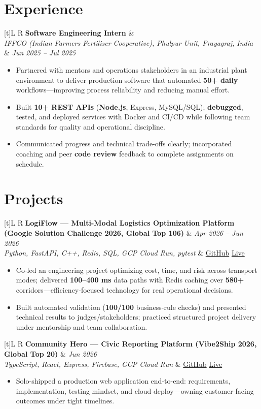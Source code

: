 \documentclass[a4paper,10pt]{article}
\newcommand{\resumeSubheading}[4]{%
  \vspace{0.4mm}
  \noindent
  \begin{tabularx}{\textwidth}[t]{L R}
    \textbf{#1} & #4 \\
    \textit{#3} & \textit{#2} \\
  \end{tabularx}
  \vspace{-0.4mm}%
}
\newcommand{\resumeProject}[4]{%
  \vspace{0.4mm}
  \noindent
  \begin{tabularx}{\textwidth}[t]{L R}
    \textbf{#1} & \textit{#3} \\
    \textit{#2} & #4 \\
  \end{tabularx}
  \vspace{-0.4mm}%
}
\begin{document}
\section{Experience}
\small
\resumeSubheading
  {Software Engineering Intern}{Jun 2025 -- Jul 2025}
  {IFFCO (Indian Farmers Fertiliser Cooperative), Phulpur Unit, Prayagraj, India}{}
\begin{itemize}
  \item Partnered with mentors and operations stakeholders in an industrial plant environment to deliver production software that automated \textbf{50+ daily} workflows---improving process reliability and reducing manual effort.
  \item Built \textbf{10+ REST APIs} (\textbf{Node.js}, Express, MySQL/SQL); \textbf{debugged}, tested, and deployed services with Docker and CI/CD while following team standards for quality and operational discipline.
  \item Communicated progress and technical trade-offs clearly; incorporated coaching and peer \textbf{code review} feedback to complete assignments on schedule.
\end{itemize}

\section{Projects}
\small

\resumeProject
  {LogiFlow --- Multi-Modal Logistics Optimization Platform (Google Solution Challenge 2026, Global Top 106)}
  {Python, FastAPI, C++, Redis, SQL, GCP Cloud Run, pytest}
  {Apr 2026 -- Jun 2026}
  {\href{https://github.com/Ojas-Srivastava05/LogiFlow-Solution-Challenge-2026}{GitHub} \textbar{} \href{https://logi-flow-solution-challenge-2026.vercel.app/}{Live}}
\begin{itemize}
  \item Co-led an engineering project optimizing cost, time, and risk across transport modes; delivered \textbf{100--400 ms} data paths with Redis caching over \textbf{580+} corridors---efficiency-focused technology for real operational decisions.
  \item Built automated validation (\textbf{100/100} business-rule checks) and presented technical results to judges/stakeholders; practiced structured project delivery under mentorship and team collaboration.
\end{itemize}

\resumeProject
  {Community Hero --- Civic Reporting Platform (Vibe2Ship 2026, Global Top 20)}
  {TypeScript, React, Express, Firebase, GCP Cloud Run}
  {Jun 2026}
  {\href{https://github.com/Ojas-Srivastava05/community-hero}{GitHub} \textbar{} \href{https://community-hero-987477089222.asia-south1.run.app}{Live}}
\begin{itemize}
  \item Solo-shipped a production web application end-to-end: requirements, implementation, testing mindset, and cloud deploy---owning customer-facing outcomes under tight timelines.
\end{itemize}
\end{document}
